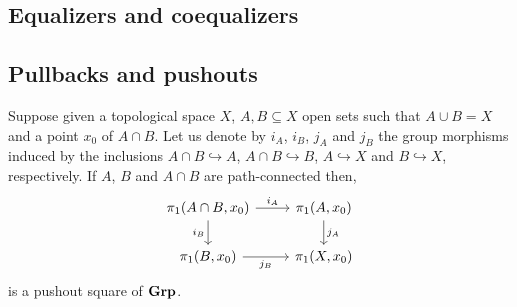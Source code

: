 \subsection{Equalizers and coequalizers}

\subsection{Pullbacks and pushouts}

\begin{example}
Suppose given a topological space \(X\), \(A, B \subseteq X\) open sets such that \(A \cup B = X\) and a point \(x_0\) of \(A \cap B\). Let us denote by \(i_A\), \(i_B\), \(j_A\) and \(j_B\) the group morphisms induced by the inclusions \(A \cap B \hookrightarrow A\), \(A \cap B \hookrightarrow B\), \(A \hookrightarrow X\) and \(B \hookrightarrow X\), respectively. If \(A\), \(B\) and \(A \cap B\) are path-connected then,
\[\begin{tikzcd}
\pi_1(A \cap B, x_0) \ar["{i_A}", r] \ar["{i_B}", d, swap] & \pi_1(A, x_0) \ar["{j_A}", d] \\
\pi_1(B, x_0) \ar["{j_B}", r, swap] & \pi_1(X, x_0)
\end{tikzcd}\]
is a pushout square of \(\mathbf{Grp}\).
\end{example}
